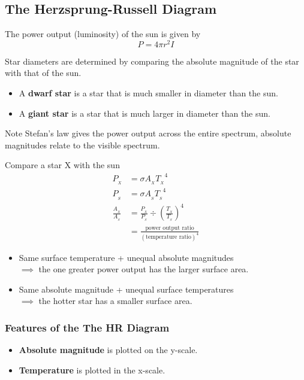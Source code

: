 \subsection{The Herzsprung-Russell Diagram}

The power output (luminosity) of the sun is given by
$$P=4\pi r^2 I$$

Star diameters are determined by comparing the absolute magnitude of the star with that of the sun.
\begin{itemize}
    \item A \textbf{dwarf star} is a star that is much smaller in diameter than the sun.
    \item A \textbf{giant star} is a star that is much larger in diameter than the sun.
\end{itemize}

Note Stefan's law gives the power output across the entire spectrum, absolute magnitudes relate to the visible spectrum.

Compare a star X with the sun
\begin{align*}
    P_{_X}&=\sigma A_{_X}{T_{_X}}^4\\
    P_{_S}&=\sigma A_{_S}{T_{_S}}^4\\
    \frac{A_{_X}}{A_{_S}}&=\frac{P_{_X}}{P_{_S}}\div\left(\frac{T_{_X}}{T_{_S}}\right)^4\\
                         &=\frac{\text{power output ratio}}{(\text{temperature ratio})^4}
\end{align*}

\begin{itemize}
    \item Same surface temperature + unequal absolute magnitudes\\$\implies$ the one greater power output has the larger surface area.
    \item Same absolute magnitude + unequal surface temperatures\\$\implies$ the hotter star has a smaller surface area.
\end{itemize}

\subsubsection*{Features of the The HR Diagram}

\begin{itemize}
    \item \textbf{Absolute magnitude} is plotted on the y-scale.
    \item \textbf{Temperature} is plotted in the x-scale.
\end{itemize}

